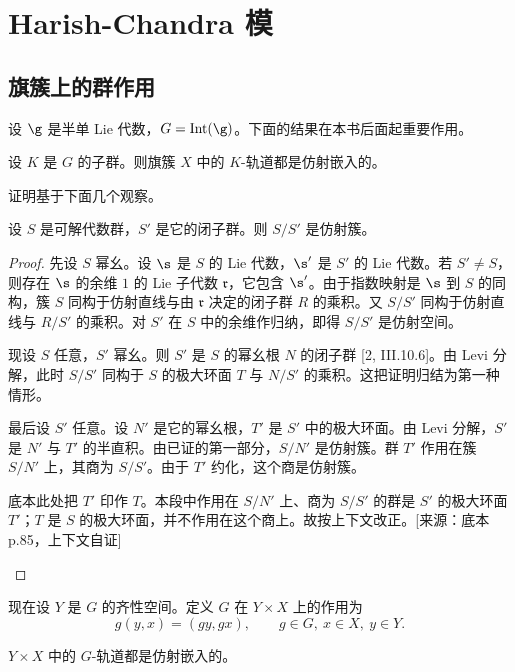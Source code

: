 \chapter{Harish-Chandra 模}
\label{ch:04.4}

\section{旗簇上的群作用}
\label{sec:04.4.1}

设 $\g$ 是半单 Lie 代数，$G=\operatorname{Int}(\g)$。下面的结果在本书后面起重要作用。

\begin{proposition}\label{prop:04.4.1.1}
设 $K$ 是 $G$ 的子群。则旗簇 $X$ 中的 $K$-轨道都是仿射嵌入的。
\end{proposition}

证明基于下面几个观察。

\begin{lemma}\label{lem:04.4.1.2}
设 $S$ 是可解代数群，$S'$ 是它的闭子群。则 $S/S'$ 是仿射簇。
\end{lemma}

\begin{proof}
先设 $S$ 幂幺。设 $\s$ 是 $S$ 的 Lie 代数，$\s'$ 是 $S'$ 的 Lie 代数。若 $S'\neq S$，则存在 $\s$ 的余维 $1$ 的 Lie 子代数 $\mathfrak{r}$，它包含 $\s'$。由于指数映射是 $\s$ 到 $S$ 的同构，簇 $S$ 同构于仿射直线与由 $\mathfrak{r}$ 决定的闭子群 $R$ 的乘积。又 $S/S'$ 同构于仿射直线与 $R/S'$ 的乘积。对 $S'$ 在 $S$ 中的余维作归纳，即得 $S/S'$ 是仿射空间。

现设 $S$ 任意，$S'$ 幂幺。则 $S'$ 是 $S$ 的幂幺根 $N$ 的闭子群 [2, III.10.6]。由 Levi 分解，此时 $S/S'$ 同构于 $S$ 的极大环面 $T$ 与 $N/S'$ 的乘积。这把证明归结为第一种情形。

最后设 $S'$ 任意。设 $N'$ 是它的幂幺根，$T'$ 是 $S'$ 中的极大环面。由 Levi 分解，$S'$ 是 $N'$ 与 $T'$ 的半直积。由已证的第一部分，$S/N'$ 是仿射簇。群 $T'$ 作用在簇 $S/N'$ 上，其商为 $S/S'$。由于 $T'$ 约化，这个商是仿射簇。
\begin{annote}
底本此处把 $T'$ 印作 $T$。本段中作用在 $S/N'$ 上、商为 $S/S'$ 的群是 $S'$ 的极大环面 $T'$；$T$ 是 $S$ 的极大环面，并不作用在这个商上。故按上下文改正。[来源：底本 p.85，上下文自证]
\end{annote}
\end{proof}

现在设 $Y$ 是 $G$ 的齐性空间。定义 $G$ 在 $Y\times X$ 上的作用为
$$g(y,x)=(gy,gx),\qquad g\in G,\ x\in X,\ y\in Y.$$

\begin{lemma}\label{lem:04.4.1.3}
$Y\times X$ 中的 $G$-轨道都是仿射嵌入的。
\end{lemma}

